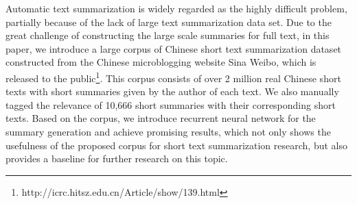 Automatic text summarization is widely regarded as the highly difficult problem, partially because of the lack of large text summarization data set. Due to the great challenge of constructing the large scale summaries for full text, in this paper, we introduce a large corpus of Chinese short text summarization dataset constructed from the Chinese microblogging website Sina Weibo, which is released to the public\footnote{http://icrc.hitsz.edu.cn/Article/show/139.html}. This corpus consists of over 2 million real Chinese short texts with short summaries given by the author of each text. We also manually tagged the relevance of 10,666 short summaries with their corresponding short texts. Based on the corpus, we introduce recurrent neural network for the summary generation and achieve promising results, which not only shows the usefulness of the proposed corpus for short text summarization research, but also provides a baseline for further research on this topic.

